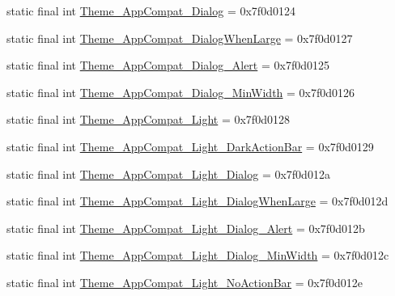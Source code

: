 \begin{DoxyCompactItemize}
\item 
static final int \mbox{\hyperlink{classcom_1_1google_1_1android_1_1gms_1_1R_1_1style_ae7f5f1a6faf02d544697dbd8777c6e64}{Theme\+\_\+\+App\+Compat\+\_\+\+Dialog}} = 0x7f0d0124
\item 
static final int \mbox{\hyperlink{classcom_1_1google_1_1android_1_1gms_1_1R_1_1style_a21bcf26c5671f323cd50a7b756691d50}{Theme\+\_\+\+App\+Compat\+\_\+\+Dialog\+When\+Large}} = 0x7f0d0127
\item 
static final int \mbox{\hyperlink{classcom_1_1google_1_1android_1_1gms_1_1R_1_1style_ad34cf0d879328462aea07ecd246fe424}{Theme\+\_\+\+App\+Compat\+\_\+\+Dialog\+\_\+\+Alert}} = 0x7f0d0125
\item 
static final int \mbox{\hyperlink{classcom_1_1google_1_1android_1_1gms_1_1R_1_1style_ad6b16087858fa09cea0105fd26c33793}{Theme\+\_\+\+App\+Compat\+\_\+\+Dialog\+\_\+\+Min\+Width}} = 0x7f0d0126
\item 
static final int \mbox{\hyperlink{classcom_1_1google_1_1android_1_1gms_1_1R_1_1style_a858328cace0b2b74e264c5977d52e578}{Theme\+\_\+\+App\+Compat\+\_\+\+Light}} = 0x7f0d0128
\item 
static final int \mbox{\hyperlink{classcom_1_1google_1_1android_1_1gms_1_1R_1_1style_ae6889af52a0e845fba5df7a87ad17b11}{Theme\+\_\+\+App\+Compat\+\_\+\+Light\+\_\+\+Dark\+Action\+Bar}} = 0x7f0d0129
\item 
static final int \mbox{\hyperlink{classcom_1_1google_1_1android_1_1gms_1_1R_1_1style_aa7941306dc24d9f4b97295355b502b4c}{Theme\+\_\+\+App\+Compat\+\_\+\+Light\+\_\+\+Dialog}} = 0x7f0d012a
\item 
static final int \mbox{\hyperlink{classcom_1_1google_1_1android_1_1gms_1_1R_1_1style_aea39bc682e635b4b44b99175454d1c20}{Theme\+\_\+\+App\+Compat\+\_\+\+Light\+\_\+\+Dialog\+When\+Large}} = 0x7f0d012d
\item 
static final int \mbox{\hyperlink{classcom_1_1google_1_1android_1_1gms_1_1R_1_1style_a8286083cfd8d0e03c4705e7d7cd39777}{Theme\+\_\+\+App\+Compat\+\_\+\+Light\+\_\+\+Dialog\+\_\+\+Alert}} = 0x7f0d012b
\item 
static final int \mbox{\hyperlink{classcom_1_1google_1_1android_1_1gms_1_1R_1_1style_a30723fc98efb904a085bb6f6cdbd25cf}{Theme\+\_\+\+App\+Compat\+\_\+\+Light\+\_\+\+Dialog\+\_\+\+Min\+Width}} = 0x7f0d012c
\item 
static final int \mbox{\hyperlink{classcom_1_1google_1_1android_1_1gms_1_1R_1_1style_a2558b35a043036355ee8f85dbc2f5de1}{Theme\+\_\+\+App\+Compat\+\_\+\+Light\+\_\+\+No\+Action\+Bar}} = 0x7f0d012e

\end{DoxyCompactItemize}
